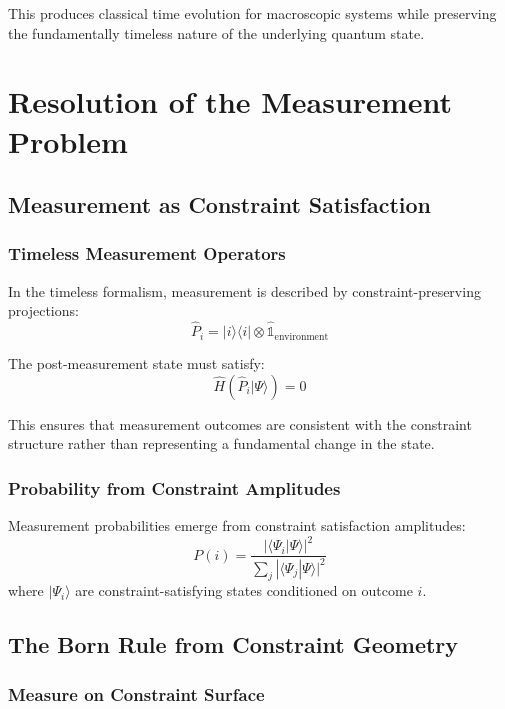 \documentclass[12pt,a4paper]{article}
\newcommand{\ket}[1]{|#1\rangle}
\newcommand{\bra}[1]{\langle#1|}
\newcommand{\braket}[2]{\langle#1|#2\rangle}
\newcommand{\op}[1]{\hat{#1}}
\begin{document}
This produces classical time evolution for macroscopic systems while preserving the fundamentally timeless nature of the underlying quantum state.

\section{Resolution of the Measurement Problem}

\subsection{Measurement as Constraint Satisfaction}

\subsubsection{Timeless Measurement Operators}

In the timeless formalism, measurement is described by constraint-preserving projections:
\begin{equation}
    \op{P}_i = \ket{i}\bra{i} \otimes \hat{\mathds{1}}_{\text{environment}}
\end{equation}

The post-measurement state must satisfy:
\begin{equation}
    \op{H}(\op{P}_i\ket{\Psi}) = 0
\end{equation}

This ensures that measurement outcomes are consistent with the constraint structure rather than representing a fundamental change in the state.

\subsubsection{Probability from Constraint Amplitudes}

Measurement probabilities emerge from constraint satisfaction amplitudes:
\begin{equation}
    P(i) = \frac{|\braket{\Psi_i}{\Psi}|^2}{\sum_j |\braket{\Psi_j}{\Psi}|^2}
\end{equation}
where $\ket{\Psi_i}$ are constraint-satisfying states conditioned on outcome $i$.

\subsection{The Born Rule from Constraint Geometry}

\subsubsection{Measure on Constraint Surface}
\end{document}
